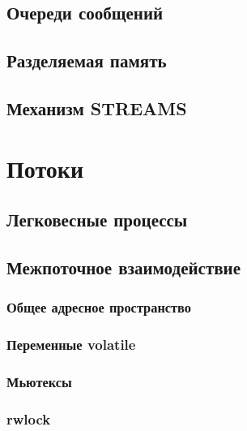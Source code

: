 \documentclass[oneside]{book}
\begin{document}
		\section{Очереди сообщений}
			

		\section{Разделяемая память}
			

		\section{Механизм STREAMS}
			

	\chapter{Потоки}
	

		\section{Легковесные процессы}
		

		\section{Межпоточное взаимодействие}
			
		
			\subsection{Общее адресное пространство}
				
		
			\subsection{Переменные volatile}
					
	
			\subsection{Мьютексы}
				
			
			\subsection{rwlock}
				
		
		
		

	
\end{document}
